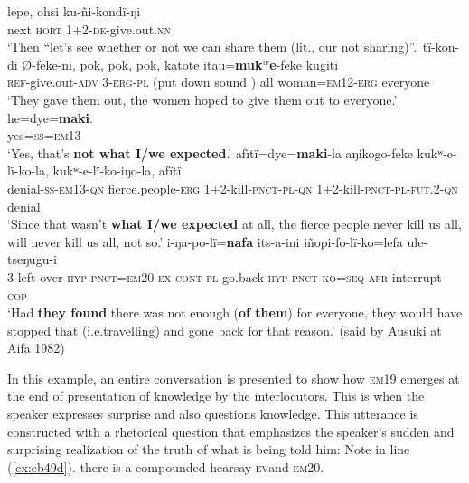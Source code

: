 \documentclass[output=paper]{langsci/langscibook}
\begin{document}
\begin{exe}
\ex \label{ex:eb48}
	\begin{xlist}
	\ex \label{ex:eb48a}
	\gll lepe, ohsi ku-ñi-kondï-ŋi\\
	next \textsc{hort} 1+2-\textsc{de}-give.out.\textsc{nn}\\
	\trans ‘Then  “let’s see whether or not we can share them (lit., our not sharing)”.’
	\ex \label{ex:eb48b}
	\gll tï-kon-di Ø-feke-ni, {pok, pok, pok,} katote itau=\textbf{muk$^w$e}-feke kugiti\\
	\textsc{ref}-give.out-\textsc{adv} 3-\textsc{erg-pl} {(put down sound )} all woman=\textsc{em12-erg} everyone\\
	\trans ‘They gave them out, the women hoped to give them out to everyone.’
	\ex \label{ex:eb48c}
	\gll he=dye=\textbf{maki}.\\
	yes=\textsc{ss=em13}\\
	\trans ‘Yes, that’s \textbf{not what I/we expected}.’
	\ex \label{ex:eb48d}
	\gll afïtï=dye=\textbf{maki}-la aŋikogo-feke kukʷ-e-lï-ko-la, kukʷ-e-lï-ko-iŋo-la, afïtï\\
	denial-\textsc{ss-em13-qn} fierce.people-\textsc{erg} 1+2-kill-\textsc{pnct-pl-qn} 1+2-kill-\textsc{pnct-pl-fut.2-qn} denial\\
	\trans `Since that wasn’t \textbf{what I/we expected} at all, the fierce people never kill us all, will never  kill us all, not so.'
	\ex \label{ex:eb48e}
	\gll i-ŋa-po-lï=\textbf{nafa} its-a-ini iñopi-fo-lï-ko=lefa ule-tseŋugu-i\\
	3-left-over-\textsc{hyp-pnct=em20} \textsc{ex-cont-pl} go.back-\textsc{hyp-pnct-ko=seq} \textsc{afr}-interrupt-\textsc{cop}\\
	\trans ‘Had \textbf{they found} there was not enough (\textbf{of them}) for everyone,  they would have stopped that (i.e.travelling) and gone back for that reason.’ (said by Ausuki at Aifa 1982)
\end{xlist}
\end{exe}

In this example, an entire conversation is presented to show how \textsc{em}19 emerges at the end of presentation of knowledge by the interlocutors.  This is when the speaker expresses surprise and also questions knowledge. This utterance is constructed with a rhetorical question that emphasizes the speaker’s sudden and surprising realization of the truth of what is being told him: Note in line (\ref{ex:eb49d}). there is a compounded hearsay \textsc{ev}and \textsc{em}20. 
\end{document}

